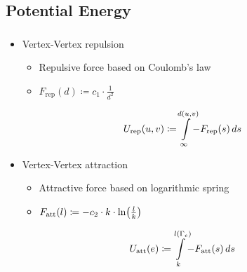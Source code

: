 \subsection{Potential Energy}
\label{subsect:application-potential-energy}

\begin{frame}
  \frametitle{\insertsubsection}
  \begin{itemize}
    \item Vertex-Vertex repulsion \begin{itemize}
      \item Repulsive force based on Coulomb's law
      \item ${F_\text{rep}(d) \coloneqq c_1 \cdot \frac{1}{d^2}}$
    \end{itemize}
  \end{itemize}
  \begin{equation*}
    U_\text{rep}(u, v) \coloneqq{} \int\limits_{\infty}^{\mathclap{d(u, v)}} -F_\text{rep}(s) \differential{s}
  \end{equation*}
  \begin{itemize}
    \item Vertex-Vertex attraction \begin{itemize}
      \item Attractive force based on logarithmic spring
      \item ${F_\text{att}(l) \coloneqq -c_2 \cdot k \cdot {\ln}{\left({\frac{l}{k}}\right)}}$
    \end{itemize}
  \end{itemize}
  \begin{equation*}
    U_\text{att}(e) \coloneqq{} \int\limits_{k}^{\mathclap{l(\Gamma_e)}} -F_\text{att}(s) \differential{s}
  \end{equation*}
\end{frame}

